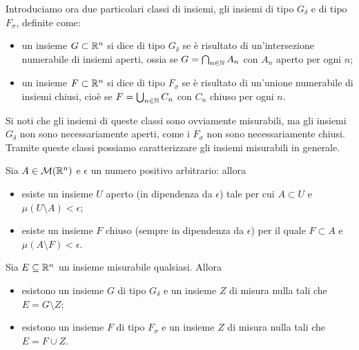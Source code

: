 Introduciamo ora due particolari classi di insiemi, gli insiemi di tipo $G_\delta$ e di tipo $F_\sigma$, definite come:
\begin{itemize}
	\item un insieme $G\subset\mathbb{R}^n$ si dice di tipo $G_\delta$ se è risultato di un'intersezione numerabile di insiemi aperti, ossia se $G=\bigcap_{n\in\mathbb{N}}A_n$ con $A_n$ aperto per ogni $n$;
	\item un insieme $F\subset\mathbb{R}^n$ si dice di tipo $F_\sigma$ se è risultato di un'unione numerabile di insiemi chiusi, cioè se $F=\bigcup_{n\in\mathbb{N}}C_n$ con $C_n$ chiuso per ogni $n$.
\end{itemize}
Si noti che gli insiemi di queste classi sono ovviamente misurabili, ma gli insiemi $G_\delta$ non sono necessariamente aperti, come i $F_\sigma$ non sono necessariamente chiusi.
Tramite queste classi possiamo caratterizzare gli insiemi misurabili in generale.
\begin{lemma} \label{l:aperti-chiusi-poco-differenti}
	Sia $A\in\mathcal M(\mathbb{R}^n)$ e $\epsilon$ un numero positivo arbitrario: allora
	\begin{itemize}
		\item esiste un insieme $U$ aperto (in dipendenza da $\epsilon$) tale per cui $A\subset U$ e $\mu(U\setminus A)<\epsilon$;
		\item esiste un insieme $F$ chiuso (sempre in dipendenza da $\epsilon$) per il quale $F\subset A$ e $\mu(A\setminus F)<\epsilon$.
	\end{itemize}
\end{lemma}
\begin{teorema} \label{t:gdelta-fsigma-misurabili}
	Sia $E\subseteq\mathbb{R}^n$ un insieme misurabile qualsiasi.
	Allora
	\begin{itemize}
		\item esistono un insieme $G$ di tipo $G_\delta$ e un insieme $Z$ di misura nulla tali che $E=G\setminus Z$;
		\item esistono un insieme $F$ di tipo $F_\sigma$ e un insieme $Z$ di misura nulla tali che $E=F\cup Z$.
	\end{itemize}
\end{teorema}
